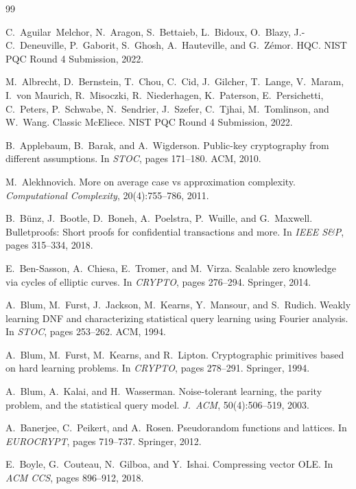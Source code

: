 \documentclass[11pt,a4paper]{article}
\theoremstyle{plain}
\theoremstyle{definition}
\begin{document}
\begin{thebibliography}{99}

C.~Aguilar~Melchor, N.~Aragon, S.~Bettaieb, L.~Bidoux, O.~Blazy, J.-C.~Deneuville, P.~Gaborit, S.~Ghosh, A.~Hauteville, and G.~Z\'emor.
HQC.
NIST PQC Round 4 Submission, 2022.

M.~Albrecht, D.~Bernstein, T.~Chou, C.~Cid, J.~Gilcher, T.~Lange, V.~Maram, I.~von Maurich, R.~Misoczki, R.~Niederhagen, K.~Paterson, E.~Persichetti, C.~Peters, P.~Schwabe, N.~Sendrier, J.~Szefer, C.~Tjhai, M.~Tomlinson, and W.~Wang.
Classic McEliece.
NIST PQC Round 4 Submission, 2022.

B.~Applebaum, B.~Barak, and A.~Wigderson.
Public-key cryptography from different assumptions.
In \emph{STOC}, pages 171--180. ACM, 2010.

M.~Alekhnovich.
More on average case vs approximation complexity.
\emph{Computational Complexity}, 20(4):755--786, 2011.

B.~B\"unz, J.~Bootle, D.~Boneh, A.~Poelstra, P.~Wuille, and G.~Maxwell.
Bulletproofs: Short proofs for confidential transactions and more.
In \emph{IEEE S\&P}, pages 315--334, 2018.

E.~Ben-Sasson, A.~Chiesa, E.~Tromer, and M.~Virza.
Scalable zero knowledge via cycles of elliptic curves.
In \emph{CRYPTO}, pages 276--294. Springer, 2014.

A.~Blum, M.~Furst, J.~Jackson, M.~Kearns, Y.~Mansour, and S.~Rudich.
Weakly learning DNF and characterizing statistical query learning using Fourier analysis.
In \emph{STOC}, pages 253--262. ACM, 1994.

A.~Blum, M.~Furst, M.~Kearns, and R.~Lipton.
Cryptographic primitives based on hard learning problems.
In \emph{CRYPTO}, pages 278--291. Springer, 1994.

A.~Blum, A.~Kalai, and H.~Wasserman.
Noise-tolerant learning, the parity problem, and the statistical query model.
\emph{J.\ ACM}, 50(4):506--519, 2003.

A.~Banerjee, C.~Peikert, and A.~Rosen.
Pseudorandom functions and lattices.
In \emph{EUROCRYPT}, pages 719--737. Springer, 2012.

E.~Boyle, G.~Couteau, N.~Gilboa, and Y.~Ishai.
Compressing vector OLE.
In \emph{ACM CCS}, pages 896--912, 2018.


\end{thebibliography}
\end{document}
